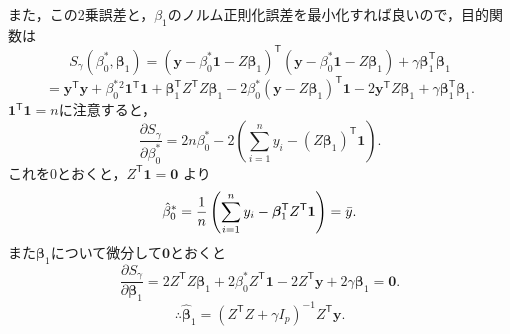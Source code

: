\documentclass[pdflatex,ja=standard]{bxjsarticle}
\begin{document}
また，この2乗誤差と，$\beta_1$のノルム正則化誤差を最小化すれば良いので，目的関数は
\begin{equation}
S_{\gamma} (\beta^{*}_0, \bm{\beta}_1) = (\bm{y} - \beta^{*}_0 \bm{1} - Z \bm{\beta}_{1})^{\mathsf{T}} (\bm{y} - \beta^{*}_0 \bm{1} - Z \bm{\beta}_{1}) + \gamma \bm{\beta}_1^{\mathsf{T}} \bm{\beta}_1
\end{equation}
\begin{equation}
= \bm{y}^{\mathsf{T}} \bm{y} + \beta^{*}_0^2 \bm{1}^{\mathsf{T}} \bm{1} + \bm{\beta}_1^{\mathsf{T}} Z^{\mathsf{T}} Z \bm{\beta}_1 - 2 \beta^{*}_0 (\bm{y} - Z \bm{\beta}_1)^{\mathsf{T}} \bm{1} -2 \bm{y}^{\mathsf{T}} Z \bm{\beta}_1 + \gamma \bm{\beta}_1^{\mathsf{T}} \bm{\beta}_1.
\end{equation}
$\bm{1}^{\mathsf{T}} \bm{1} = n$に注意すると，
\begin{equation}
\frac{\partial S_{\gamma}}{\partial \beta^{*}_0} = 2n\beta^{*}_0 - 2 \left( \sum_{i=1}^{n} y_i - (Z \bm{\beta}_1)^{\mathsf{T}} \bm{1} \right).
\end{equation}
これを0とおくと，$Z^{\mathsf{T}} \bm{1} = \bm{0}$ より
\begin{equation}
\hat{\beta}^{*}_0 = \frac{1}{n} \left( \sum_{i=1}^{n} y_i - \bm{\beta}_1^{\mathsf{T}} Z^{\mathsf{T}} \bm{1} \right) = \Bar{y}.
\end{equation}
また$\bm{\beta}_1$について微分して$\bm{0}$とおくと
\begin{equation}
\frac{\partial S_{\gamma}}{\partial \bm{\beta}_1} = 2 Z^{\mathsf{T}} Z \bm{\beta}_1 + 2 \beta^{*}_0 Z^{\mathsf{T}} \bm{1} - 2 Z^{\mathsf{T}} \bm{y} + 2 \gamma \bm{\beta}_1 = \bm{0}.
\end{equation}
\begin{equation}
\therefore \hat{\bm{\beta}}_1 = (Z^{\mathsf{T}} Z + \gamma I_p)^{-1} Z^{\mathsf{T}} \bm{y}.
\end{equation}
\end{document}

